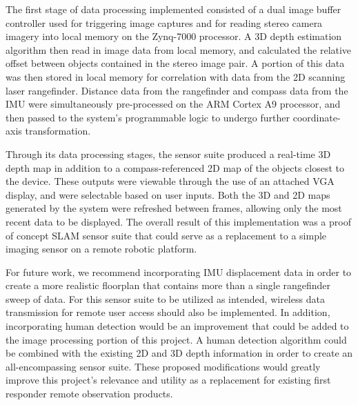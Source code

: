 \par
The first stage of data processing implemented consisted of a dual image buffer controller used for triggering image captures and for reading stereo camera imagery into local memory on the Zynq-7000 processor. A 3D depth estimation algorithm then read in image data from local memory, and calculated the relative offset between objects contained in the stereo image pair. A portion of this data was then stored in local memory for correlation with data from the 2D scanning laser rangefinder. Distance data from the rangefinder and compass data from the IMU were simultaneously pre-processed on the ARM Cortex A9 processor, and then passed to the system's programmable logic to undergo further coordinate-axis transformation. 
\par
Through its data processing stages, the sensor suite produced a real-time 3D depth map in addition to a compass-referenced 2D map of the objects closest to the device. These outputs were viewable through the use of an attached VGA display, and were selectable based on user inputs. Both the 3D and 2D maps generated by the system were refreshed between frames, allowing only the most recent data to be displayed. The overall result of this implementation was a proof of concept SLAM sensor suite that could serve as a replacement to a simple imaging sensor on a remote robotic platform.
\par
For future work, we recommend incorporating IMU displacement data in order to create a more realistic floorplan that contains more than a single rangefinder sweep of data. For this sensor suite to be utilized as intended, wireless data transmission for remote user access should also be implemented. In addition, incorporating human detection would be an improvement that could be added to the image processing portion of this project. A human detection algorithm could be combined with the existing 2D and 3D depth information in order to create an all-encompassing sensor suite. These proposed modifications would greatly improve this project's relevance and utility as a replacement for existing first responder remote observation products.





